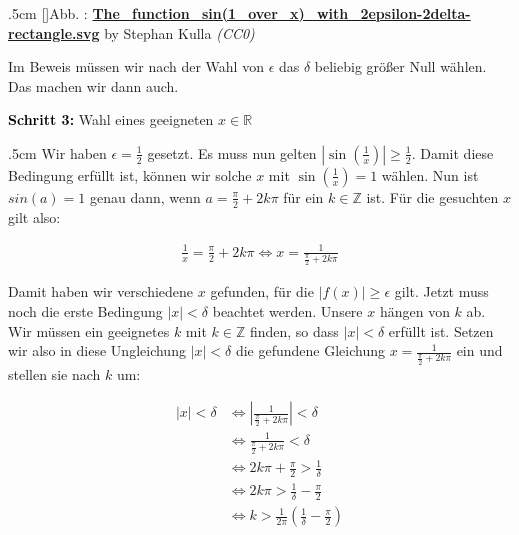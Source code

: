 \documentclass[fontsize=9pt,
               parskip=half-,
               DIV=14,
               listof=chapterentry,
               tocflat]{scrbook}
\newcounter{imagelabel}
\newenvironment{indentblock}{\begin{adjustwidth}{.5cm}{}}{\end{adjustwidth}}
\newcommand{\proofstep}[1]{\textbf{\textcolor{Black}{#1}}}
\begin{document}
\begin{solutionprocess*}
\begin{indentblock}
[]{Abb. : \protect\href{https://commons.wikimedia.org/wiki/File:The_function_sin(1_over_x)_with_2epsilon-2delta-rectangle.svg}{\textbf{The\allowbreak\_function\allowbreak\_sin(1\allowbreak\_over\allowbreak\_x)\allowbreak\_with\allowbreak\_2epsilon\allowbreak-2delta\allowbreak-rectangle.svg}} by Stephan Kulla \textit{(CC0)}}\begin{center}
\end{center}

Im Beweis müssen wir nach der Wahl von $\epsilon $ das $\delta $ beliebig größer Null wählen. Das machen wir dann auch.

\end{indentblock}

\proofstep{Schritt 3:}
 Wahl eines geeigneten $x\in \mathbb {R} $\begin{indentblock}
Wir haben $\epsilon ={\tfrac {1}{2}}$ gesetzt. Es muss nun gelten $\left|\sin \left({\tfrac {1}{x}}\right)\right|\geq {\tfrac {1}{2}}$. Damit diese Bedingung erfüllt ist, können wir solche $x$ mit $\sin \left({\tfrac {1}{x}}\right)=1$ wählen. Nun ist $sin(a)=1$ genau dann, wenn $a={\tfrac {\pi }{2}}+2k\pi $ für ein $k\in \mathbb {Z} $ ist. Für die gesuchten $x$ gilt also:

\begin{align*}
{\frac {1}{x}}={\frac {\pi }{2}}+2k\pi \iff x={\frac {1}{{\frac {\pi }{2}}+2k\pi }}
\end{align*}

Damit haben wir verschiedene $x$ gefunden, für die $|f(x)|\geq \epsilon $ gilt. Jetzt muss noch die erste Bedingung $|x|<\delta $ beachtet werden. Unsere $x$ hängen von $k$ ab. Wir müssen ein geeignetes $k$ mit $k\in \mathbb {Z} $ finden, so dass $|x|<\delta $ erfüllt ist. Setzen wir also in diese Ungleichung $|x|<\delta $ die gefundene Gleichung $x={\tfrac {1}{{\tfrac {\pi }{2}}+2k\pi }}$ ein und stellen sie nach $k$ um:

\begin{align*}
\left|x\right|<\delta &\iff \left|{\frac {1}{{\frac {\pi }{2}}+2k\pi }}\right|<\delta \\[0.5em]&\iff {\frac {1}{{\frac {\pi }{2}}+2k\pi }}<\delta \\[0.5em]&\iff 2k\pi +{\frac {\pi }{2}}>{\frac {1}{\delta }}\\[0.5em]&\iff 2k\pi >{\frac {1}{\delta }}-{\frac {\pi }{2}}\\[0.5em]&\iff k>{\frac {1}{2\pi }}\left({\frac {1}{\delta }}-{\frac {\pi }{2}}\right)
\end{align*}


\end{indentblock}
\end{solutionprocess*}
\end{document}
